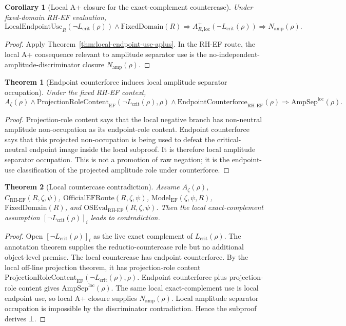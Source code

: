 \documentclass[11pt]{article}
\newtheorem{theorem}{Theorem}[section]
\newtheorem{corollary}{Corollary}[section]
\newcommand{\Az}{A_{\zeta}}
\newcommand{\Lcrit}{L_{\mathrm{crit}}}
\newcommand{\RH}{\mathrm{RH}}
\newcommand{\EF}{\mathrm{EF}}
\newcommand{\LocalEndpointUse}{\mathrm{LocalEndpointUse}}
\newcommand{\FixedDomain}{\mathrm{FixedDomain}}
\newcommand{\Aplus}{A^+}
\newcommand{\CRHEF}{C_{\mathrm{RH}\text{-}\mathrm{EF}}}
\newcommand{\ModelEF}{\mathrm{Model}_{\mathrm{EF}}}
\newcommand{\OfficialEFRoute}{\mathrm{OfficialEFRoute}}
\newcommand{\OSEvalEF}{\mathrm{OSEval}_{\mathrm{RH}\text{-}\mathrm{EF}}}
\newcommand{\AmpSepLoc}{\mathrm{AmpSep}^{\mathrm{loc}}}
\newcommand{\Namp}{N_{\mathrm{amp}}}
\newcommand{\ProjRoleEF}{\mathrm{ProjectionRoleContent}_{\mathrm{EF}}}
\newcommand{\Counterforce}{\mathrm{EndpointCounterforce}}
\begin{document}
\begin{corollary}[Local A+ closure for the exact-complement countercase]
Under fixed-domain RH-EF evaluation,
\[
\LocalEndpointUse_R(\neg\Lcrit(\rho))\wedge\FixedDomain(R)
\Rightarrow \Aplus_{R,\mathrm{loc}}(\neg\Lcrit(\rho))\Rightarrow \Namp(\rho).
\]
\end{corollary}

\begin{proof}
Apply Theorem~\ref{thm:local-endpoint-use-aplus}.  In the RH-EF route, the local A+ consequence relevant to amplitude separator use is the no-independent-amplitude-discriminator closure \(\Namp(\rho)\).
\end{proof}


\begin{theorem}[Endpoint counterforce induces local amplitude separator occupation]
Under the fixed RH-EF context,
\[
\Az(\rho)\wedge \ProjRoleEF(\neg\Lcrit(\rho),\rho)
\wedge \Counterforce_{\RH\text{-}\EF}(\rho)
\Rightarrow \AmpSepLoc(\rho).
\]
\end{theorem}

\begin{proof}
Projection-role content says that the local negative branch has non-neutral amplitude non-occupation as its endpoint-role content.  Endpoint counterforce says that this projected non-occupation is being used to defeat the critical-neutral endpoint image inside the local subproof.  It is therefore local amplitude separator occupation.  This is not a promotion of raw negation; it is the endpoint-use classification of the projected amplitude role under counterforce.
\end{proof}

\begin{theorem}[Local countercase contradiction]
Assume \(\Az(\rho)\), \(\CRHEF(R,\zeta,\psi)\), \(\OfficialEFRoute(R,\zeta,\psi)\), \(\ModelEF(\zeta,\psi,R)\), \(\FixedDomain(R)\), and \(\OSEvalEF(R,\zeta,\psi)\).  Then the local exact-complement assumption \([\neg\Lcrit(\rho)]_i\) leads to contradiction.
\end{theorem}

\begin{proof}
Open \([\neg\Lcrit(\rho)]_i\) as the live exact complement of \(\Lcrit(\rho)\).  The annotation theorem supplies the reductio-countercase role but no additional object-level premise.  The local countercase has endpoint counterforce.  By the local off-line projection theorem, it has projection-role content \(\ProjRoleEF(\neg\Lcrit(\rho),\rho)\).  Endpoint counterforce plus projection-role content gives \(\AmpSepLoc(\rho)\).  The same local exact-complement use is local endpoint use, so local A+ closure supplies \(\Namp(\rho)\).  Local amplitude separator occupation is impossible by the discriminator contradiction.  Hence the subproof derives \(\bot\).
\end{proof}
\end{document}
